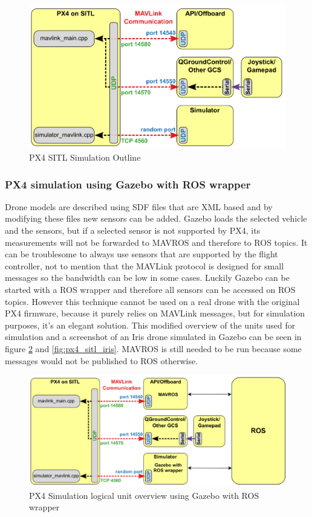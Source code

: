 \begin{figure}[h]
    \centering
    \includegraphics[width=120mm, keepaspectratio]{figures/px4_sitl_overview.png}
    \caption{PX4 SITL Simulation Outline \cite{PX4Simulation}}
    \label{fig:px4_sitl_simulation}
\end{figure}

\subsubsection{PX4 simulation using Gazebo with ROS wrapper}

Drone models are described using SDF files that are XML based and by modifying these files new sensors can 
be added. Gazebo loads the selected vehicle and the sensors, but if a selected sensor is not supported by
PX4, its measurements will not be forwarded to MAVROS and therefore to ROS topics. It can be troublesome 
to always use sensors that are supported by the flight controller, not to mention that the MAVLink protocol 
is designed for small messages so the bandwidth can be low in some cases. Luckily Gazebo can 
be started with a ROS wrapper and therefore all sensors can be accessed on ROS topics. However this technique
cannot be used on a real drone with the original PX4 firmware, because it purely relies on MAVLink messages, 
but for simulation purposes, it's an elegant solution. This modified overview of the units used for simulation
and a screenshot of an Iris drone simulated in Gazebo can be seen in figure \ref{fig:px4_sitl_ros_wrapper} and 
\ref{fig:px4_sitl_iris}. 
MAVROS is still needed to be run because some messages would not be published to ROS otherwise.

\begin{figure}[h]
    \centering
    \includegraphics[width=140mm, keepaspectratio]{figures/px4_sitl_with_ros.png}
    \caption{PX4 Simulation logical unit overview using Gazebo with ROS wrapper}
    \label{fig:px4_sitl_ros_wrapper}
\end{figure}

